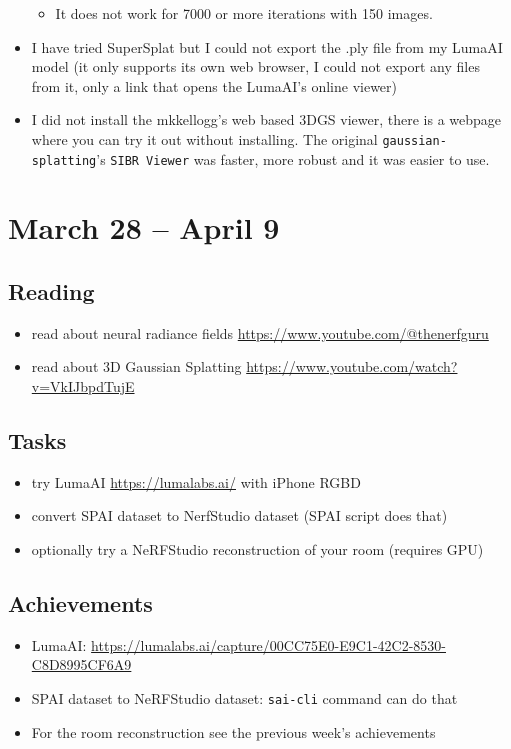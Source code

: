 \documentclass{article}
\begin{document}
\begin{itemize}
\begin{itemize}
        \item It does not work for 7000 or more iterations with 150 images.
    \end{itemize}
\item I have tried SuperSplat but I could not export the .ply file from my LumaAI model (it only supports its own web browser, I could not export any files from it, only a link that opens the LumaAI's online viewer)
\item I did not install the mkkellogg's web based 3DGS viewer, there is a webpage where you can try it out without installing. The original \verb|gaussian-splatting|'s \verb|SIBR Viewer| was faster, more robust and it was easier to use.
\end{itemize}


\newpage


\section{March 28 -- April 9}
\subsection{Reading}
\begin{itemize}
    \item read about neural radiance fields \url{https://www.youtube.com/@thenerfguru}
    \item read about 3D Gaussian Splatting \url{https://www.youtube.com/watch?v=VkIJbpdTujE}
\end{itemize}

\subsection{Tasks}
\begin{itemize}
\item try LumaAI \url{https://lumalabs.ai/} with iPhone RGBD 
\item convert SPAI dataset to NerfStudio dataset (SPAI script does that) 
\item optionally try a NeRFStudio reconstruction of your room (requires GPU) 
\end{itemize}

\subsection{Achievements}
\begin{itemize}
    \item LumaAI: \url{https://lumalabs.ai/capture/00CC75E0-E9C1-42C2-8530-C8D8995CF6A9}
    \item SPAI dataset to NeRFStudio dataset: \verb|sai-cli| command can do that
    \item For the room reconstruction see the previous week's achievements
\end{itemize}
\end{document}
